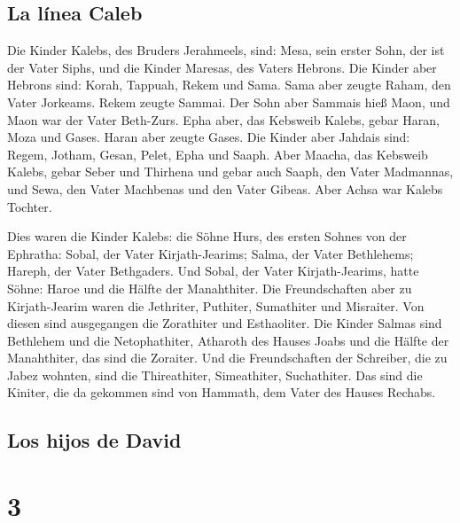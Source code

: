 \hypertarget{la-luxednea-caleb-1}{%
\subsection{La línea Caleb}\label{la-luxednea-caleb-1}}

 Die Kinder Kalebs, des Bruders Jerahmeels, sind: Mesa,
sein erster Sohn, der ist der Vater Siphs, und die Kinder Maresas, des
Vaters Hebrons.  Die Kinder aber Hebrons sind: Korah,
Tappuah, Rekem und Sama.  Sama aber zeugte Raham, den
Vater Jorkeams. Rekem zeugte Sammai.  Der Sohn aber
Sammais hieß Maon, und Maon war der Vater Beth-Zurs. 
Epha aber, das Kebsweib Kalebs, gebar Haran, Moza und Gases. Haran aber
zeugte Gases.  Die Kinder aber Jahdais sind: Regem,
Jotham, Gesan, Pelet, Epha und Saaph.  Aber Maacha, das
Kebsweib Kalebs, gebar Seber und Thirhena  und gebar auch
Saaph, den Vater Madmannas, und Sewa, den Vater Machbenas und den Vater
Gibeas. Aber Achsa war Kalebs Tochter.

 Dies waren die Kinder Kalebs: die Söhne Hurs, des ersten
Sohnes von der Ephratha: Sobal, der Vater Kirjath-Jearims;
 Salma, der Vater Bethlehems; Hareph, der Vater
Bethgaders.  Und Sobal, der Vater Kirjath-Jearims, hatte
Söhne: Haroe und die Hälfte der Manahthiter.  Die
Freundschaften aber zu Kirjath-Jearim waren die Jethriter, Puthiter,
Sumathiter und Misraiter. Von diesen sind ausgegangen die Zorathiter und
Esthaoliter.  Die Kinder Salmas sind Bethlehem und die
Netophathiter, Atharoth des Hauses Joabs und die Hälfte der Manahthiter,
das sind die Zoraiter.  Und die Freundschaften der
Schreiber, die zu Jabez wohnten, sind die Thireathiter, Simeathiter,
Suchathiter. Das sind die Kiniter, die da gekommen sind von Hammath, dem
Vater des Hauses Rechabs.

\hypertarget{los-hijos-de-david}{%
\subsection{Los hijos de David}\label{los-hijos-de-david}}

\hypertarget{section-2}{%
\section{3}\label{section-2}}

